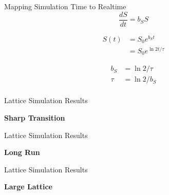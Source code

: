 \documentclass[11pt]{beamer}              %
\begin{document}
\begin{frame}{Mapping Simulation Time to Realtime}
  \begin{equation*}
    \frac{dS}{dt} = b_S S
  \end{equation*}

  \begin{align*}
    S(t) &= S_0 e^{b_S t} \\
    &= S_0 e^{\ln2 t / \tau}
  \end{align*}

  \begin{align*}
    b_S  &= \ln 2 / \tau \\
    \tau &= \ln 2 / b_S \\
  \end{align*}
\end{frame}

\begin{frame}{Lattice Simulation Results}

  \textbf{Sharp Transition}
  \vfill
\end{frame}


\begin{frame}{Lattice Simulation Results}

  \textbf{Long Run}
  \vfill
\end{frame}

\begin{frame}{Lattice Simulation Results}

  \textbf{Large Lattice}
  \vfill
\end{frame}

\end{document}
